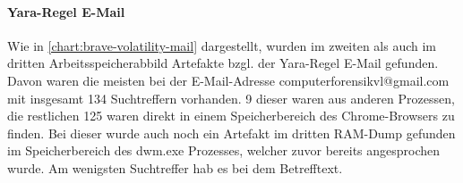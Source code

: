 \paragraph*{Yara-Regel \glqq{}E-Mail\grqq{}}\label{chap:ergebnisse-brave-uncommon-locations-volatility-email}

Wie in \autoref{chart:brave-volatility-mail} dargestellt, wurden im zweiten als auch im dritten Arbeitsspeicherabbild Artefakte bzgl. der Yara-Regel \glqq{}E-Mail\grqq{} gefunden. Davon waren die meisten bei der E-Mail-Adresse \glqq{}computerforensikvl@gmail.com\grqq{} mit insgesamt 134 Suchtreffern vorhanden. 9 dieser waren aus anderen Prozessen, die restlichen 125 waren direkt in einem Speicherbereich des Chrome-Browsers zu finden. Bei dieser wurde auch noch ein Artefakt im dritten RAM-Dump gefunden im Speicherbereich des dwm.exe Prozesses, welcher zuvor bereits angesprochen wurde. Am wenigsten Suchtreffer hab es bei dem Betrefftext.

